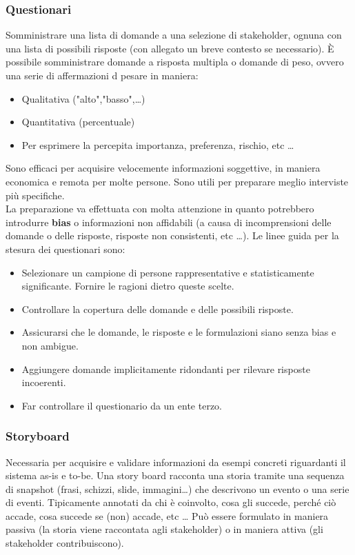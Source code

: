 \documentclass[../main.tex]{subfiles}
\begin{document}
\subsubsection{Questionari}
Somministrare una lista di domande a una selezione di stakeholder, ognuna con una lista di possibili risposte (con allegato un breve contesto se necessario).
È possibile somministrare domande a risposta multipla o domande di peso, ovvero una serie di affermazioni d pesare in maniera:
\begin{itemize}
	\item Qualitativa ("alto","basso",\dots)
	\item Quantitativa (percentuale)
	\item Per esprimere la percepita importanza, preferenza, rischio, etc \dots
\end{itemize}
Sono efficaci per acquisire velocemente informazioni soggettive, in maniera economica e remota per molte persone.
Sono utili per preparare meglio interviste più specifiche.
\\
La preparazione va effettuata con molta attenzione in quanto potrebbero introdurre \textbf{bias} o informazioni non affidabili (a causa di incomprensioni delle domande o delle risposte, risposte non consistenti, etc \dots).
Le linee guida per la stesura dei questionari sono:
\begin{itemize}
	\item Selezionare un campione di persone rappresentative e statisticamente significante. Fornire le ragioni dietro queste scelte.
	\item Controllare la copertura delle domande e delle possibili risposte.
	\item Assicurarsi che le domande, le risposte e le formulazioni siano senza bias e non ambigue.
	\item Aggiungere domande implicitamente ridondanti per rilevare risposte incoerenti.
	\item Far controllare il questionario da un ente terzo.
\end{itemize}
\subsubsection{Storyboard}
Necessaria per acquisire e validare informazioni da esempi concreti riguardanti il sistema as-is e to-be.
Una story board racconta una storia tramite una sequenza di snapshot (frasi, schizzi, slide, immagini\dots) che descrivono un evento o una serie di eventi. Tipicamente annotati da chi è coinvolto, cosa gli succede, perché ciò accade, cosa succede se (non) accade, etc \dots
Può essere formulato in maniera passiva (la storia viene raccontata agli stakeholder) o in maniera attiva (gli stakeholder contribuiscono).
\end{document}
